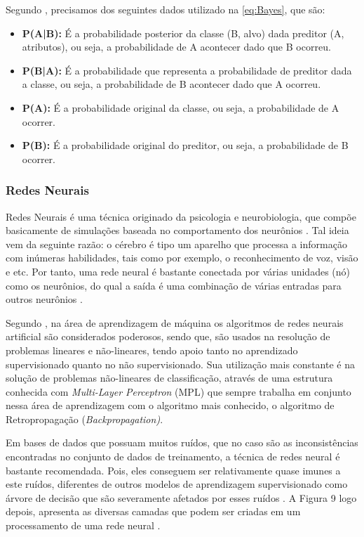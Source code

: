 \par
Segundo , precisamos dos seguintes dados utilizado na \autoref{eq:Bayes}, que são:
\begin{itemize}
    \item \textbf{P(A|B):} É a probabilidade posterior da classe (B, alvo) dada preditor (A, atributos), ou seja, a probabilidade de A acontecer dado que B ocorreu.
    \item \textbf{P(B|A):} É a probabilidade que representa a probabilidade de preditor dada a classe, ou seja, a probabilidade de B acontecer dado que A ocorreu.
    \item \textbf{P(A):} É a probabilidade original da classe, ou seja, a probabilidade de A ocorrer.
     \item \textbf{P(B):} É a probabilidade original do preditor, ou seja, a probabilidade de B ocorrer.
\end{itemize}

\subsubsection{Redes Neurais}

\par
Redes Neurais é uma técnica originado da psicologia e neurobiologia, que compõe basicamente de simulações baseada no comportamento dos neurônios \cite{Camilo2009}. Tal ideia vem da seguinte razão: o cérebro é tipo um aparelho que processa a informação com inúmeras habilidades, tais como por exemplo, o reconhecimento de voz, visão e etc. Por tanto, uma rede neural é bastante conectada por várias unidades (nó) como os neurônios, do qual a saída é uma combinação de várias entradas para outros neurônios \cite{Henke2011, Barros2012}.

\par
Segundo \cite{Carvalho2014}, na área de aprendizagem de máquina os algoritmos de redes neurais artificial são considerados poderosos, sendo que, são usados na resolução de problemas lineares e não-lineares, tendo apoio tanto no aprendizado supervisionado quanto no não supervisionado. Sua utilização mais constante é na solução de problemas não-lineares de classificação, através de uma estrutura conhecida com \textit{Multi-Layer Perceptron} (MPL) que sempre trabalha em conjunto nessa área de aprendizagem com o algoritmo mais conhecido, o algoritmo de Retropropagação (\textit{Backpropagation)}.

\par
Em bases de dados que possuam muitos ruídos, que no caso são as inconsistências encontradas no conjunto de dados de treinamento, a técnica de redes neural é bastante recomendada. Pois, eles conseguem ser relativamente quase imunes a este ruídos, diferentes de outros modelos de aprendizagem supervisionado como árvore de decisão que são severamente afetados por esses ruídos \cite{Carvalho2014}. A Figura 9 logo depois, apresenta as diversas camadas que podem ser criadas em um processamento de uma rede neural \cite{Cortes2002}.

